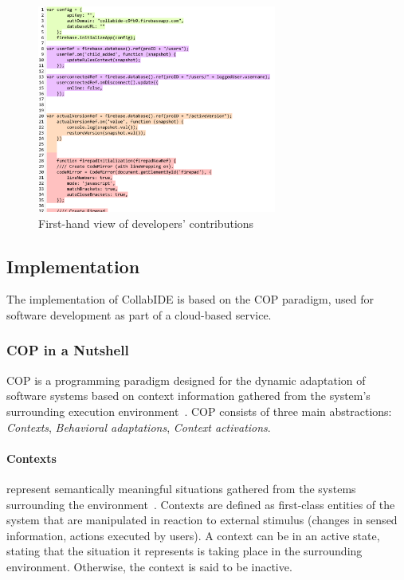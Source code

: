 \begin{figure}[htbp]
  \centering
  \includegraphics[width=0.7\textwidth]{img/fig2-collabIDEConcurrentProgramming}
  \caption{First-hand view of developers' contributions}
  \label{fig:layers}
\end{figure}


\subsection{Implementation}
\label{sec:implementation}

The implementation of CollabIDE is based on the \acf{COP} paradigm, used for software development 
as part of a cloud-based service.

\subsubsection{\ac{COP} in a Nutshell}
\ac{COP} is a programming paradigm designed for the dynamic adaptation of software systems based 
on context information gathered from the system's surrounding execution 
environment~\cite{salvaneschi+12survey}. \ac{COP} consists of three main abstractions: 
\emph{Contexts}, \emph{Behavioral adaptations}, \emph{Context activations}.

\paragraph{Contexts} represent semantically meaningful situations gathered from the systems 
surrounding the environment~\cite{dey01}. Contexts are defined as first-class entities of the system that 
are manipulated in reaction to external stimulus (\eg changes in sensed information, actions executed 
by users). A context can be in an active state, stating that the situation it represents is taking place in 
the surrounding environment. Otherwise, the context is said to be inactive.

